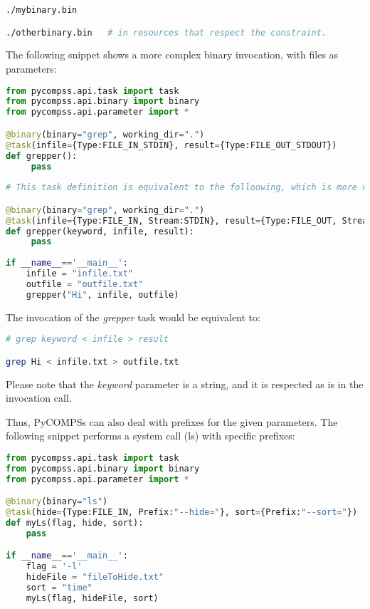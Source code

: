 \begin{lstlisting}[language=bash]
./mybinary.bin 

./otherbinary.bin   # in resources that respect the constraint.
\end{lstlisting}

The following snippet shows a more complex binary invocation, with files as parameters:

\begin{lstlisting}[language=python]
from pycompss.api.task import task
from pycompss.api.binary import binary
from pycompss.api.parameter import *

@binary(binary="grep", working_dir=".")
@task(infile={Type:FILE_IN_STDIN}, result={Type:FILE_OUT_STDOUT})
def grepper():
     pass
     
# This task definition is equivalent to the folloowing, which is more verbose:

@binary(binary="grep", working_dir=".")
@task(infile={Type:FILE_IN, Stream:STDIN}, result={Type:FILE_OUT, Stream:STDOUT})
def grepper(keyword, infile, result):
     pass
     
if __name__=='__main__':
    infile = "infile.txt"
    outfile = "outfile.txt"
    grepper("Hi", infile, outfile)
\end{lstlisting}

The invocation of the {\it grepper} task would be equivalent to:

\begin{lstlisting}[language=bash]
# grep keyword < infile > result

grep Hi < infile.txt > outfile.txt
\end{lstlisting}

Please note that the {\it keyword} parameter is a string, and it is respected as is in the invocation call.

Thus, PyCOMPSs can also deal with prefixes for the given parameters. 
The following snippet performs a system call (ls) with specific prefixes:

\begin{lstlisting}[language=python]
from pycompss.api.task import task
from pycompss.api.binary import binary
from pycompss.api.parameter import *

@binary(binary="ls")
@task(hide={Type:FILE_IN, Prefix:"--hide="}, sort={Prefix:"--sort="})
def myLs(flag, hide, sort):
    pass

if __name__=='__main__':
    flag = '-l'
    hideFile = "fileToHide.txt"
    sort = "time"
    myLs(flag, hideFile, sort)
\end{lstlisting}

